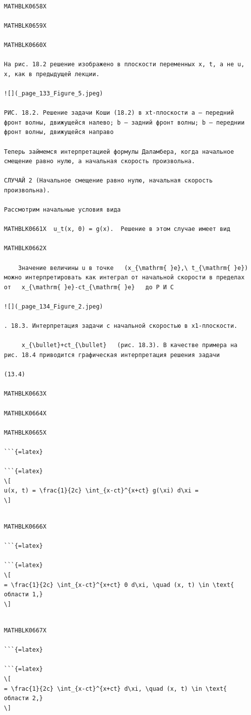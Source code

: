 \documentclass[
]{article}
\begin{document}
\begin{verbatim}

MATHBLK0658X

MATHBLK0659X

MATHBLK0660X

На рис. 18.2 решение изображено в плоскости переменных x, t, а не u, x, как в предыдущей лекции.

![](_page_133_Figure_5.jpeg)

РИС. 18.2. Решение задачи Коши (18.2) в xt-плоскости a — передний фронт волны, движущейся налево; b — задний фронт волны; b — переднии фронт волны, движущейся направо

Теперь займемся интерпретацией формулы Даламбера, когда начальное смещение равно нулю, а начальная скорость произвольна.

СЛУЧАЙ 2 (Начальное смещение равно нулю, начальная скорость произвольна).

Рассмотрим начальные условия вида

MATHBLK0661X  u_t(x, 0) = g(x).  Решение в этом случае имеет вид

MATHBLK0662X

    Значение величины u в точке   (x_{\mathrm{ }e},\ t_{\mathrm{ }e})   можно интерпретировать как интеграл от начальной скорости в пределах от   x_{\mathrm{ }e}-ct_{\mathrm{ }e}   до Р И С

![](_page_134_Figure_2.jpeg)

. 18.3. Интерпретация задачи с начальной скоростью в x1-плоскости.

     x_{\bullet}+ct_{\bullet}   (рис. 18.3). В качестве примера на рис. 18.4 приводится графическая интерпретация решения задачи

(13.4)

MATHBLK0663X

MATHBLK0664X

MATHBLK0665X

```{=latex}

```{=latex}
\[
u(x, t) = \frac{1}{2c} \int_{x-ct}^{x+ct} g(\xi) d\xi =
\]
\end{verbatim}

\begin{verbatim}

MATHBLK0666X

```{=latex}

```{=latex}
\[
= \frac{1}{2c} \int_{x-ct}^{x+ct} 0 d\xi, \quad (x, t) \in \text{ области 1,}
\]
\end{verbatim}

\begin{verbatim}

MATHBLK0667X

```{=latex}

```{=latex}
\[
= \frac{1}{2c} \int_{x-ct}^{x+ct} d\xi, \quad (x, t) \in \text{ области 2,}
\]
\end{verbatim}
\end{document}
